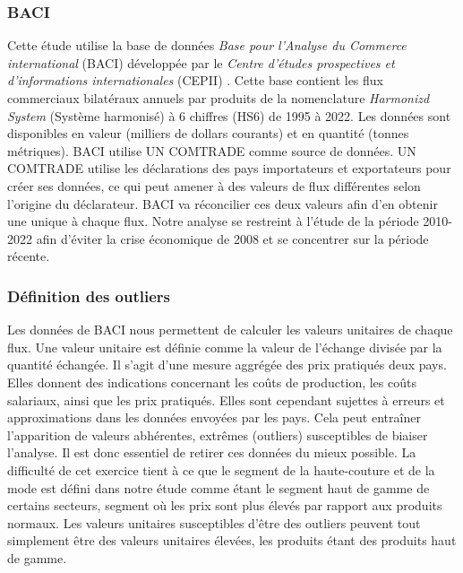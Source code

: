 \documentclass[french,10pt,a4paper]{article}
\begin{document}
\subsubsection*{BACI}
Cette étude utilise la base de données \textit{Base pour l'Analyse du Commerce international} (BACI) développée par le \textit{Centre d'études prospectives et d'informations internationales} (CEPII) \citep{Gaulier2010}. Cette base contient les flux commerciaux bilatéraux annuels par produits de la nomenclature \textit{Harmonizd System} (Système harmonisé) à 6 chiffres (HS6) de 1995 à 2022. Les données sont disponibles en valeur (milliers de dollars courants) et en quantité (tonnes métriques). BACI utilise UN COMTRADE comme source de données. UN COMTRADE utilise les déclarations des pays importateurs et exportateurs pour créer ses données, ce qui peut amener à des valeurs de flux différentes selon l'origine du déclarateur. BACI va réconcilier ces deux valeurs afin d'en obtenir une unique à chaque flux. Notre analyse se restreint à l'étude de la période 2010-2022 afin d'éviter la crise économique de 2008 et se concentrer sur la période récente.

\subsubsection*{Définition des outliers}
Les données de BACI nous permettent de calculer les valeurs unitaires de chaque flux. Une valeur unitaire est définie comme la valeur de l'échange divisée par la quantité échangée. Il s'agit d'une mesure aggrégée des prix pratiqués deux pays. Elles donnent des indications concernant les coûts de production, les coûts salariaux, ainsi que les prix pratiqués. Elles sont cependant sujettes à erreurs et approximations dans les données envoyées par les pays. Cela peut entraîner l'apparition de valeurs abhérentes, extrêmes (outliers) susceptibles de biaiser l'analyse. Il est donc essentiel de retirer ces données du mieux possible. La difficulté de cet exercice tient à ce que le segment de la haute-couture et de la mode est défini dans notre étude comme étant le segment haut de gamme de certains secteurs, segment où les prix sont plus élevés par rapport aux produits normaux. Les valeurs unitaires susceptibles d'être des outliers peuvent tout simplement être des valeurs unitaires élevées, les produits étant des produits haut de gamme.
\end{document}
